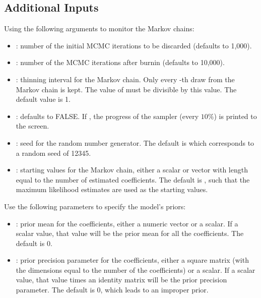 \documentclass[letterpaper,10pt,english]{sphinxmanual}
\begin{document}
\subsection{Additional Inputs}
\label{vignette:id100}
Using the following arguments to monitor the Markov chains:
\begin{itemize}
\item {} 
: number of the initial MCMC iterations to be discarded
(defaults to 1,000).

\item {} 
: number of the MCMC iterations after burnin (defaults to
10,000).

\item {} 
: thinning interval for the Markov chain. Only every
-th draw from the Markov chain is kept. The value of 
must be divisible by this value. The default value is 1.

\item {} 
: defaults to FALSE. If , the progress of the
sampler (every \(10\%\)) is printed to the screen.

\item {} 
: seed for the random number generator. The default is 
which corresponds to a random seed of 12345.

\item {} 
: starting values for the Markov chain, either a scalar
or vector with length equal to the number of estimated coefficients.
The default is , such that the maximum likelihood estimates are
used as the starting values.

\end{itemize}

Use the following parameters to specify the model’s priors:
\begin{itemize}
\item {} 
: prior mean for the coefficients, either a numeric vector or a
scalar. If a scalar value, that value will be the prior mean for all
the coefficients. The default is 0.

\item {} 
: prior precision parameter for the coefficients, either a
square matrix (with the dimensions equal to the number of the
coefficients) or a scalar. If a scalar value, that value times an
identity matrix will be the prior precision parameter. The default is
0, which leads to an improper prior.

\end{itemize}
\end{document}
